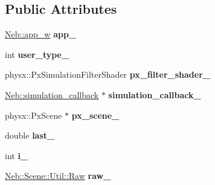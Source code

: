 \subsection*{\-Public \-Attributes}
\begin{DoxyCompactItemize}
\item 
\hypertarget{classNeb_1_1Scene_1_1Base_a1381978e049d4da1a319dd827565d097}{\hyperlink{classNeb_1_1weak__ptr}{\-Neb\-::app\-\_\-w} {\bfseries app\-\_\-}}\label{classNeb_1_1Scene_1_1Base_a1381978e049d4da1a319dd827565d097}

\item 
\hypertarget{classNeb_1_1Scene_1_1Base_a9565c11540a076e5aacf5cc072a1a7eb}{int {\bfseries user\-\_\-type\-\_\-}}\label{classNeb_1_1Scene_1_1Base_a9565c11540a076e5aacf5cc072a1a7eb}

\item 
\hypertarget{classNeb_1_1Scene_1_1Base_aed874c0aa2d03387a5a126cdd0fe76e6}{physx\-::\-Px\-Simulation\-Filter\-Shader {\bfseries px\-\_\-filter\-\_\-shader\-\_\-}}\label{classNeb_1_1Scene_1_1Base_aed874c0aa2d03387a5a126cdd0fe76e6}

\item 
\hypertarget{classNeb_1_1Scene_1_1Base_a234a837620e5d08bc794ae589d1b7b3a}{\hyperlink{classNeb_1_1simulation__callback}{\-Neb\-::simulation\-\_\-callback} $\ast$ {\bfseries simulation\-\_\-callback\-\_\-}}\label{classNeb_1_1Scene_1_1Base_a234a837620e5d08bc794ae589d1b7b3a}

\item 
\hypertarget{classNeb_1_1Scene_1_1Base_ac1716b66b914b8fd8e04f2de16eff4b6}{physx\-::\-Px\-Scene $\ast$ {\bfseries px\-\_\-scene\-\_\-}}\label{classNeb_1_1Scene_1_1Base_ac1716b66b914b8fd8e04f2de16eff4b6}

\item 
\hypertarget{classNeb_1_1Scene_1_1Base_a9c2b45c827982c73a5601f03085095b7}{double {\bfseries last\-\_\-}}\label{classNeb_1_1Scene_1_1Base_a9c2b45c827982c73a5601f03085095b7}

\item 
\hypertarget{classNeb_1_1Scene_1_1Base_a24a4b1c10edf4b5b1656fb4764308652}{int {\bfseries i\-\_\-}}\label{classNeb_1_1Scene_1_1Base_a24a4b1c10edf4b5b1656fb4764308652}

\item 
\hypertarget{classNeb_1_1Scene_1_1Base_a3c19f5a0b3b8c0c275bbebff036d88de}{\hyperlink{classNeb_1_1Scene_1_1Util_1_1Raw}{\-Neb\-::\-Scene\-::\-Util\-::\-Raw} {\bfseries raw\-\_\-}}\label{classNeb_1_1Scene_1_1Base_a3c19f5a0b3b8c0c275bbebff036d88de}


\end{DoxyCompactItemize}
